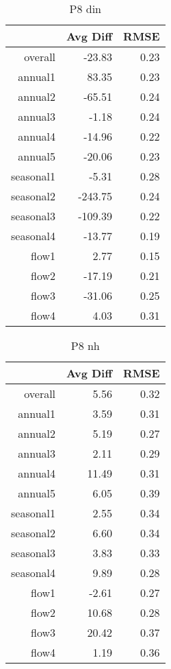 \begin{table}[H]
\centering
\begin{tabular}{rrr}
  \hline
 & Avg Diff & RMSE \\ 
  \hline
overall & -23.83 & 0.23 \\ 
  annual1 & 83.35 & 0.23 \\ 
  annual2 & -65.51 & 0.24 \\ 
  annual3 & -1.18 & 0.24 \\ 
  annual4 & -14.96 & 0.22 \\ 
  annual5 & -20.06 & 0.23 \\ 
  seasonal1 & -5.31 & 0.28 \\ 
  seasonal2 & -243.75 & 0.24 \\ 
  seasonal3 & -109.39 & 0.22 \\ 
  seasonal4 & -13.77 & 0.19 \\ 
  flow1 & 2.77 & 0.15 \\ 
  flow2 & -17.19 & 0.21 \\ 
  flow3 & -31.06 & 0.25 \\ 
  flow4 & 4.03 & 0.31 \\ 
   \hline
\end{tabular}
\caption{P8 din} 
\end{table}
\begin{table}[H]
\centering
\begin{tabular}{rrr}
  \hline
 & Avg Diff & RMSE \\ 
  \hline
overall & 5.56 & 0.32 \\ 
  annual1 & 3.59 & 0.31 \\ 
  annual2 & 5.19 & 0.27 \\ 
  annual3 & 2.11 & 0.29 \\ 
  annual4 & 11.49 & 0.31 \\ 
  annual5 & 6.05 & 0.39 \\ 
  seasonal1 & 2.55 & 0.34 \\ 
  seasonal2 & 6.60 & 0.34 \\ 
  seasonal3 & 3.83 & 0.33 \\ 
  seasonal4 & 9.89 & 0.28 \\ 
  flow1 & -2.61 & 0.27 \\ 
  flow2 & 10.68 & 0.28 \\ 
  flow3 & 20.42 & 0.37 \\ 
  flow4 & 1.19 & 0.36 \\ 
   \hline
\end{tabular}
\caption{P8 nh} 
\end{table}
